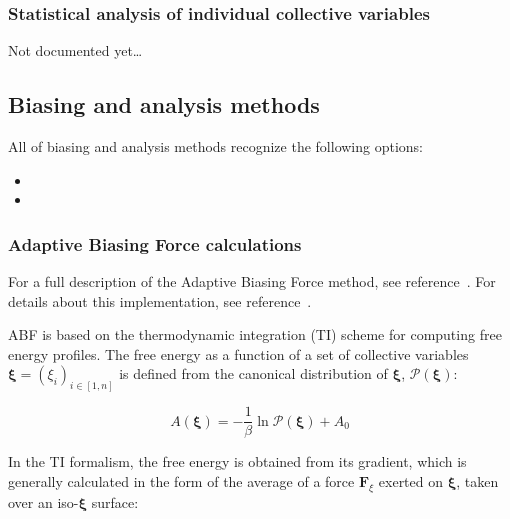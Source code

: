 \subsubsection*{Statistical analysis of individual collective variables}
\label{sec:colvar_acf}

Not documented yet\ldots


\subsection{Biasing and analysis methods}
\label{sec:colvarbias}

All of biasing and analysis methods recognize the following
options:
\begin{itemize}
\item %
\item %
\end{itemize}


\subsubsection{Adaptive Biasing Force calculations}
\label{sec:colvarbias_abf}

For a full description of the Adaptive Biasing Force method, see
reference~\cite{Darve2008}. For details about this implementation,
see reference~\cite{Henin2004}.

ABF is based on the thermodynamic integration (TI) scheme for
computing free energy profiles. The free energy as a function
of a set of collective variables $\bm{\xi}=(\xi_i)_{i\in[1,n]}$
is defined from the canonical distribution of $\bm{\xi}$, ${\mathcal P}(\bm{\xi})$:

\begin{equation}
  \label{eq:free}
  A(\bm{\xi}) = -\frac{1}{\beta} \ln {\mathcal P}(\bm{\xi}) + A_0
\end{equation}

In the TI formalism, the free energy is obtained from its gradient, 
which is generally calculated in the form of the average of a force
$\bm{F}_\xi$ exerted on $\bm{\xi}$, taken over an iso-$\bm{\xi}$ surface:

